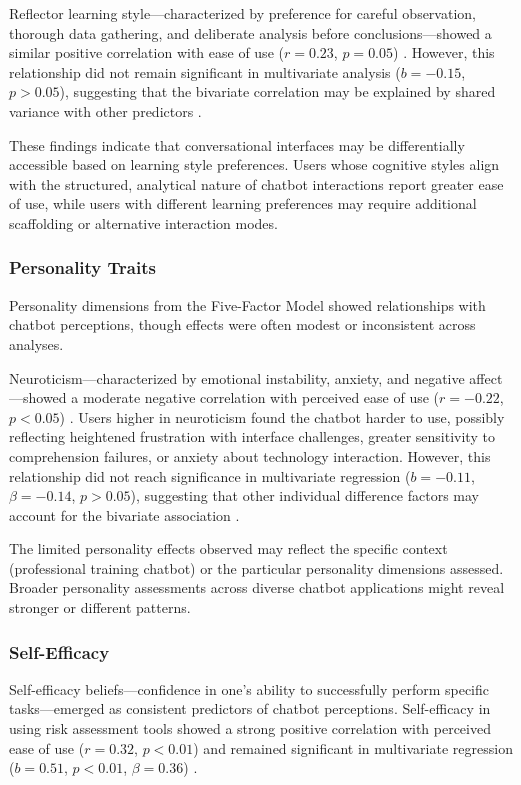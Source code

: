 \documentclass[manuscript,anonymous,sigconf]{acmart}
\begin{document}
Reflector learning style---characterized by preference for careful observation, thorough data gathering, and deliberate analysis before conclusions---showed a similar positive correlation with ease of use ($r = 0.23$, $p = 0.05$) \cite{A54}. However, this relationship did not remain significant in multivariate analysis ($b = -0.15$, $p > 0.05$), suggesting that the bivariate correlation may be explained by shared variance with other predictors \cite{A54}.

These findings indicate that conversational interfaces may be differentially accessible based on learning style preferences. Users whose cognitive styles align with the structured, analytical nature of chatbot interactions report greater ease of use, while users with different learning preferences may require additional scaffolding or alternative interaction modes.

\subsubsection{Personality Traits}

Personality dimensions from the Five-Factor Model showed relationships with chatbot perceptions, though effects were often modest or inconsistent across analyses.

Neuroticism---characterized by emotional instability, anxiety, and negative affect---showed a moderate negative correlation with perceived ease of use ($r = -0.22$, $p < 0.05$) \cite{A54}. Users higher in neuroticism found the chatbot harder to use, possibly reflecting heightened frustration with interface challenges, greater sensitivity to comprehension failures, or anxiety about technology interaction. However, this relationship did not reach significance in multivariate regression ($b = -0.11$, $\beta = -0.14$, $p > 0.05$), suggesting that other individual difference factors may account for the bivariate association \cite{A54}.

The limited personality effects observed may reflect the specific context (professional training chatbot) or the particular personality dimensions assessed. Broader personality assessments across diverse chatbot applications might reveal stronger or different patterns.

\subsubsection{Self-Efficacy}

Self-efficacy beliefs---confidence in one's ability to successfully perform specific tasks---emerged as consistent predictors of chatbot perceptions. Self-efficacy in using risk assessment tools showed a strong positive correlation with perceived ease of use ($r = 0.32$, $p < 0.01$) and remained significant in multivariate regression ($b = 0.51$, $p < 0.01$, $\beta = 0.36$) \cite{A54}.
\end{document}
